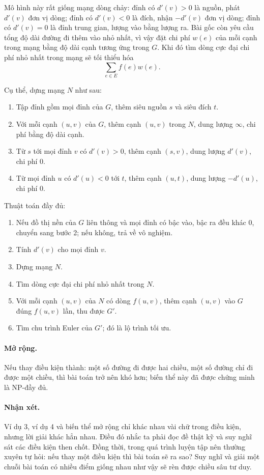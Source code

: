 \documentclass[11pt]{article}
\begin{document}
Mô hình này rất giống mạng dòng chảy: đỉnh có \(d'(v)>0\) là nguồn, phát
\(d'(v)\) đơn vị dòng; đỉnh có \(d'(v)<0\) là đích, nhận \(-d'(v)\) đơn vị
dòng; đỉnh có \(d'(v)=0\) là đỉnh trung gian, lượng vào bằng lượng ra. Bài gốc
còn yêu cầu tổng độ dài đường đi thêm vào nhỏ nhất, vì vậy đặt chi phí
\(w(e)\) của mỗi cạnh trong mạng bằng độ dài cạnh tương ứng trong \(G\). Khi
đó tìm dòng cực đại chi phí nhỏ nhất trong mạng sẽ tối thiểu hóa
\[
  \sum_{e\in E} f(e)w(e).
\]

Cụ thể, dựng mạng \(N\) như sau:
\begin{enumerate}
  \item Tập đỉnh gồm mọi đỉnh của \(G\), thêm siêu nguồn \(s\) và siêu đích
  \(t\).
  \item Với mỗi cạnh \((u,v)\) của \(G\), thêm cạnh \((u,v)\) trong \(N\), dung
  lượng \(\infty\), chi phí bằng độ dài cạnh.
  \item Từ \(s\) tới mọi đỉnh \(v\) có \(d'(v)>0\), thêm cạnh \((s,v)\), dung
  lượng \(d'(v)\), chi phí \(0\).
  \item Từ mọi đỉnh \(u\) có \(d'(u)<0\) tới \(t\), thêm cạnh \((u,t)\), dung
  lượng \(-d'(u)\), chi phí \(0\).
\end{enumerate}

Thuật toán đầy đủ:
\begin{enumerate}
  \item Nếu đồ thị nền của \(G\) liên thông và mọi đỉnh có bậc vào, bậc ra đều
  khác \(0\), chuyển sang bước 2; nếu không, trả về vô nghiệm.
  \item Tính \(d'(v)\) cho mọi đỉnh \(v\).
  \item Dựng mạng \(N\).
  \item Tìm dòng cực đại chi phí nhỏ nhất trong \(N\).
  \item Với mỗi cạnh \((u,v)\) của \(N\) có dòng \(f(u,v)\), thêm cạnh
  \((u,v)\) vào \(G\) đúng \(f(u,v)\) lần, thu được \(G'\).
  \item Tìm chu trình Euler của \(G'\); đó là lộ trình tối ưu.
\end{enumerate}

\paragraph{Mở rộng.}
Nếu thay điều kiện thành: một số đường đi được hai chiều, một số đường chỉ đi
được một chiều, thì bài toán trở nên khó hơn; biến thể này đã được chứng minh
là NP-đầy đủ.

\paragraph{Nhận xét.}
Ví dụ 3, ví dụ 4 và biến thể mở rộng chỉ khác nhau vài chữ trong điều kiện,
nhưng lời giải khác hẳn nhau. Điều đó nhắc ta phải đọc đề thật kỹ và suy nghĩ
sát các điều kiện then chốt. Đồng thời, trong quá trình luyện tập nên thường
xuyên tự hỏi: nếu thay một điều kiện thì bài toán sẽ ra sao? Suy nghĩ và giải
một chuỗi bài toán có nhiều điểm giống nhau như vậy sẽ rèn được chiều sâu tư
duy.
\end{document}
